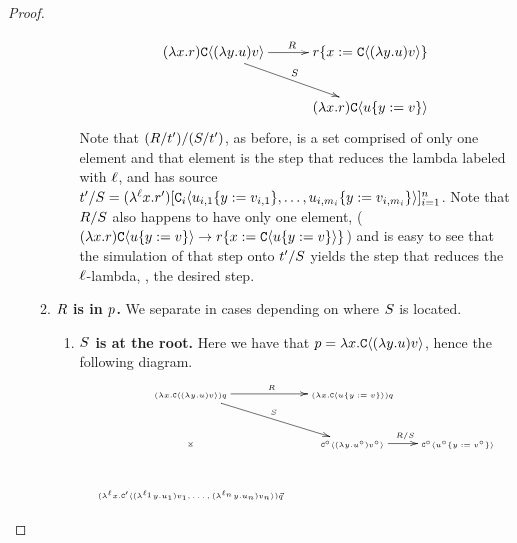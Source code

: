 \begin{proof}
\begin{enumerate}
\begin{enumerate}
\begin{enumerate}
\[            \xymatrix@C=1cm{
              (\lam{\var}{\tmfour}) \conof{(\lam{\vartwo}{\tmthree}) \tmthreevariant}
                \ar@{->}[r]^{\redex} \ar@{->}[rd]^{\redextwo}
                  & \subs{\tmfour}{\var}{\conof{(\lam{\vartwo}{\tmthree}) \tmthreevariant}} \\
                & (\lam{\var}{\tmfour}) \conof{\subs{\tmthree}{\vartwo}{\tmthreevariant}} \\
            }
            \]
            Note that $(R / t') / (S / t')$, as before, is a set comprised of only one element
            and that element is the step that reduces the lambda labeled with $\ell$, and has source
            $t' / S = (\lambda^{\ell} x. r')[
              \mathtt{C}_i\langle u_{i,1}\{y := v_{i,1}\}, \hdots, u_{i,m_i}\{y := v_{i,m_i}\}\rangle]_{i=1}^n$.
            Note that $R / S$ also happens to have only one element,
            ($(\lambda x. r) \mathtt{C}\langle u\{y := v\}\rangle \to
              r\{x := \mathtt{C}\langle u\{y := v\}\rangle\}$)
            and is easy to see that the simulation of that step onto
            $t' / S$
            yields the step that reduces the $\ell$-lambda, \ie, the desired step.
        \end{enumerate}
      \item {\bf $R$ is in $p$.} We separate in cases depending on where $S$ is located.
        \begin{enumerate}
          \item {\bf $S$ is at the root.}
            Here we have that $p = \lambda x. \mathtt{C}\langle(\lambda y. u) v\rangle$, hence
            the following diagram.
            \[
            {\tiny
              \xymatrix@C=.5cm{
              (\lam{\var}{\conof{(\lam{\vartwo}{\tmthree}) \tmthreevariant}}) \tmsix
                \ar@{->}[r]^{\redex} \ar@{->}[rd]^{\redextwo} \ar@{}[dd]|*=0[@]{\rtimes}
                  & (\lam{\var}{\conof{\subs{\tmthree}{\vartwo}{\tmthreevariant}}}) \tmsix & \\
                & \con^{\circ}\of{(\lam{\vartwo}{\tmthree^{\circ}}) \tmthreevariant^{\circ}}
                  \ar@{->}[r]^{\redex / \redextwo}
                  & \con^{\circ}\of{\subs{\tmthree^{\circ}}{\vartwo}{\tmthreevariant^{\circ}}} \\
              (\lamp{\lab}{\var}{\con'\of{(\lamp{\lab_1}{\vartwo}{\tmthree_1}) \tmthreevariant_1, \hdots, (\lamp{\lab_n}{\vartwo}{\tmthree_n}) \tmthreevariant_n}}) \ls{\tmsix}
}}\]
\end{enumerate}
\end{enumerate}
\end{enumerate}
\end{proof}
